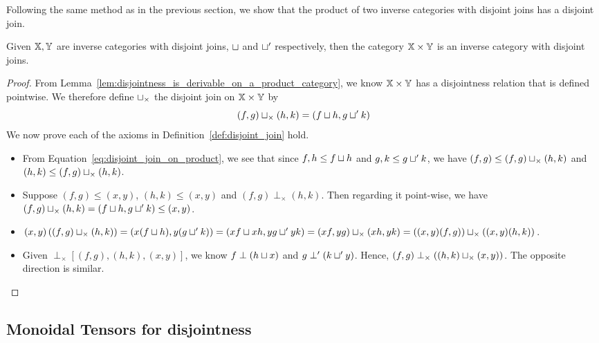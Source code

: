 Following the same method as in the previous section, we show that the product of two
inverse categories with disjoint joins has a disjoint join.
\begin{lemma}\label{lem:disjoint_join_is_in_product_category}
  Given $\mathbb{X}, \mathbb{Y}$ are inverse categories with disjoint joins, $\sqcup$ and $\sqcup'$ respectively,
  then the category $\mathbb{X} \times \mathbb{Y}$ is an inverse category with disjoint joins.
\end{lemma}
\begin{proof}
  From Lemma~\ref{lem:disjointness_is_derivable_on_a_product_category}, we know $\mathbb{X}\times\mathbb{Y}$ has a
  disjointness relation that is defined pointwise.  We therefore define $\sqcup_{\times}$ the
  disjoint join on $\mathbb{X}\times\mathbb{Y}$ by
  \begin{equation}
    (f,g)\sqcup_{\times}(h,k) = (f \sqcup h, g \sqcup' k) \label{eq:disjoint_join_on_product}
  \end{equation}
  We now prove each of the axioms in Definition~\ref{def:disjoint_join} hold.
  \begin{itemize}
    \item [\axiom{DJ}{1}] From Equation~\eqref{eq:disjoint_join_on_product}, we see that since
      $f,h \le f \sqcup h$ and $g,k \le g \sqcup' k$, we have $(f,g) \le (f,g)\sqcup_{\times}(h,k)$
      and  $(h,k) \le (f,g)\sqcup_{\times}(h,k)$.
    \item [\axiom{DJ}{2}] Suppose $(f,g) \le (x,y)$, $(h,k) \le (x,y)$ and $(f,g) \perp_{\times}
      (h,k)$. Then regarding it point-wise, we have $(f,g)\sqcup_{\times}(h,k) = (f \sqcup h, g
      \sqcup' k) \le (x,y)$.
    \item [\axiom{DJ}{3}] $(x,y)\left((f,g)\sqcup_{\times}(h,k)\right) = (x(f \sqcup h), y(g
      \sqcup' k)) = (x f \sqcup x h, y g \sqcup' y k) = (x f,y g)\sqcup_{\times}(x h,y k) =
      ((x,y)(f,g))\sqcup_{\times}((x,y)(h,k))$.
    \item [\axiom{DJ}{4}] Given $\perp_{\times}\!\![(f,g),(h,k),(x,y)]$, we know $f \perp (h\sqcup
      x)$ and $g \perp' (k\sqcup' y)$. Hence, $(f,g) \perp_{\times}((h,k)\sqcup_{\times}(x,y))$. The
      opposite direction is similar.
  \end{itemize}
\end{proof}


\subsection{Monoidal Tensors for disjointness} %
\label{sub:tensors_for_disjointness}

